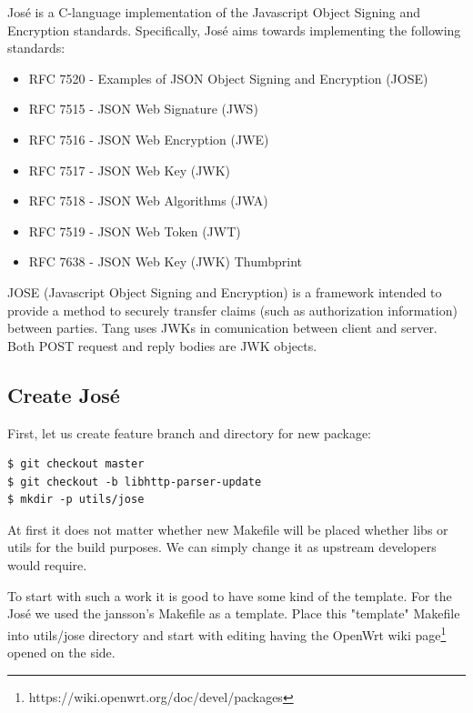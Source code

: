 José is a C-language implementation of the Javascript Object Signing and Encryption standards.
Specifically, José aims towards implementing the following standards:
\begin{itemize}
    \item RFC 7520 - Examples of JSON Object Signing and Encryption (JOSE) \cite{RFC7520}
    \item RFC 7515 - JSON Web Signature (JWS)        \cite{RFC7515}
    \item RFC 7516 - JSON Web Encryption (JWE)       \cite{RFC7516}
    \item RFC 7517 - JSON Web Key (JWK)              \cite{RFC7517}
    \item RFC 7518 - JSON Web Algorithms (JWA)       \cite{RFC7518}
    \item RFC 7519 - JSON Web Token (JWT)            \cite{RFC7519}
    \item RFC 7638 - JSON Web Key (JWK) Thumbprint   \cite{RFC7638}
\end{itemize}

JOSE (Javascript Object Signing and Encryption) is a framework intended to provide a method to securely transfer claims (such as authorization information) between parties.
Tang uses JWKs in comunication between client and server.
Both POST request and reply bodies are JWK objects\cite{jose_prog}.



\subsection{Create José}\label{jose}

First, let us create feature branch and directory for new package:
\begin{lstlisting}[columns=fixed,basicstyle=\ttfamily\footnotesize,tabsize=4,backgroundcolor=\color{yellow!10}]
$ git checkout master
$ git checkout -b libhttp-parser-update
$ mkdir -p utils/jose
\end{lstlisting}
At first it does not matter whether new Makefile will be placed whether libs or utils for the build purposes.
We can simply change it as upstream developers would require.

To start with such a work it is good to have some kind of the template.
For the José we used the jansson's Makefile as a template.
Place this "template" Makefile into utils/jose directory and start with editing having the OpenWrt wiki page\footnote{https://wiki.openwrt.org/doc/devel/packages} opened on the side.

